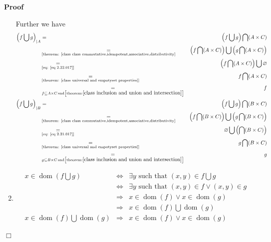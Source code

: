 \documentclass{book}
\newcommand{\equallim}{\mathop{=}\limits}
\newcommand{\tmop}[1]{\ensuremath{\operatorname{#1}}}
\newenvironment{proof}{\noindent\textbf{Proof\ }}{\hspace*{\fill}$\Box$\medskip}
\begin{document}
\begin{proof}
\begin{enumerate}
    Further we have
    \begin{eqnarray*}
      \left( f \bigcup g \right)_{|A} & = & \left( f \bigcup g \right) \bigcap
      (A \times C)\\
      & \equallim_{\text{[theorem: \ref{class class
      commutative,idempotent,associative,distributivity}}} & \left( f \bigcap
      (A \times C) \right) \bigcup \left( g \bigcap (A \times C) \right)\\
      & \equallim_{\text{[eq: \ref{eq 2.22.017}]}} & \left( f \bigcap (A
      \times C) \right) \bigcup \varnothing\\
      & \equallim_{\text{[theorem: \ref{class universal and empotyset
      properties}]}} & f \bigcap (A \times C)\\
      & \equallim_{f \subseteq A \times C \tmop{snd} \left[ \tmop{theorem} :
      \ref{class inclusion and union and intersection} \right]} & f\\
      \left( f \bigcup g \right)_{|B} & = & \left( f \bigcup g \right) \bigcap
      (B \times C)\\
      & \equallim_{\text{[theorem: \ref{class class
      commutative,idempotent,associative,distributivity}}} & \left( f \bigcap
      (B \times C) \right) \bigcup \left( g \bigcap (B \times C) \right)\\
      & \equallim_{\text{[eq: \ref{eq 2.21.017}]}} & \varnothing \bigcup
      \left( \bigcap (B \times C) \right)\\
      & \equallim_{\text{[theorem: \ref{class universal and empotyset
      properties}]}} & g \bigcap (B \times C)\\
      & \equallim_{g \subseteq B \times C \tmop{snd} \left[ \tmop{theorem} :
      \ref{class inclusion and union and intersection} \right]} & g
    \end{eqnarray*}
    \item 
    \begin{eqnarray*}
      x \in \tmop{dom} \left( f \bigcup g \right) & \Leftrightarrow & \exists
      y \text{ such that } (x, y) \in f \bigcup g\\
      & \Leftrightarrow & \exists y \text{ such that } (x, y) \in f \vee (x,
      y) \in g\\
      & \Rightarrow & x \in \tmop{dom} (f) \vee x \in \tmop{dom} (g)\\
      & \Rightarrow & x \in \tmop{dom} (f) \bigcup \tmop{dom} (g)\\
      x \in \tmop{dom} (f) \bigcup \tmop{dom} (g) & \Rightarrow & x \in
      \tmop{dom} (f) \vee x \in \tmop{dom} (g)\\

\end{eqnarray*}
\end{enumerate}
\end{proof}
\end{document}
